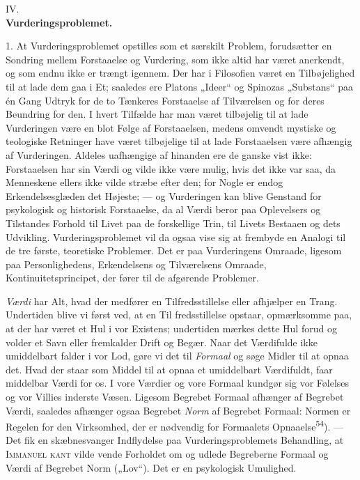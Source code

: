 \documentclass[12pt,a4paper,openany]{book}
\newcommand{\opage}[1]{\marginnote{\footnotesize\textit{[#1]}}}
\begin{document}
\opage{70}

\begin{center}IV.\\[6pt]
\textbf{\Large Vurderingsproblemet.}\end{center}

1. At Vurderingsproblemet opstilles som et særskilt Problem, forudsætter en
Sondring mellem Forstaaelse og Vurdering, som ikke altid har været anerkendt,
og som endnu ikke er trængt igennem. Der har i Filosofien været en
Tilbøjelighed til at lade dem gaa i Et; saaledes ere Platons „Ideer“ og
Spinozas „Substans“ paa én Gang Udtryk for de to Tænkeres Forstaaelse af
Tilværelsen og for deres Beundring for den. I hvert Tilfælde har man været
tilbøjelig til at lade Vurderingen være en blot Følge af Forstaaelsen, medens
omvendt mystiske og teologiske Retninger have været tilbøjelige til at lade
Forstaaelsen være afhængig af Vurderingen. Aldeles uafhængige af hinanden ere
de ganske vist ikke: Forstaaelsen har sin Værdi og vilde ikke være mulig, hvis
det ikke var saa, da Menneskene ellers ikke vilde stræbe efter den; for Nogle
er endog Erkendelsesglæden det Højeste; --- og Vurderingen kan blive Genstand
for psykologisk og historisk Forstaaelse, da al Værdi beror paa Oplevelsers og
Tilstandes Forhold til Livet paa de forskellige Trin, til Livets Bestaaen og
dets Udvikling. Vurderingsproblemet vil da ogsaa vise sig at frembyde en
Analogi til de tre første, teoretiske Problemer. Det er paa Vurderingens
Omraade, ligesom paa Personlighedens, Erkendelsens og Tilværelsens Omraade,
Kontinuitetsprincipet, der fører til de afgørende Problemer.

\textit{Værdi} har Alt, hvad der medfører en Tilfredsstillelse eller afhjælper
en Trang. Undertiden blive vi først ved, at en Til%
\opage{71}fredsstillelse opstaar, opmærksomme paa, at der har været et Hul i
vor Existens; undertiden mærkes dette Hul forud og volder et Savn eller
fremkalder Drift og Begær. Naar det Værdifulde ikke umiddelbart falder i vor
Lod, gøre vi det til \textit{Formaal} og søge Midler til at opnaa det. Hvad der
staar som Middel til at opnaa et umiddelbart Værdifuldt, faar middelbar Værdi
for os. I vore Værdier og vore Formaal kundgør sig vor Følelses og vor Villies
inderste Væsen. Ligesom Begrebet Formaal afhænger af Begrebet Værdi, saaledes
afhænger ogsaa Begrebet \textit{Norm} af Begrebet Formaal: Normen er Regelen
for den Virksomhed, der er nødvendig for Formaalets
Opnaaelse\textsuperscript{54}). --- Det fik en skæbnesvanger Indflydelse paa
Vurderingsproblemets Behandling, at \textsc{Immanuel} \textsc{kant} vilde vende
Forholdet om og udlede Begreberne Formaal og Værdi af Begrebet Norm („Lov“).
Det er en psykologisk Umulighed.
\end{document}
